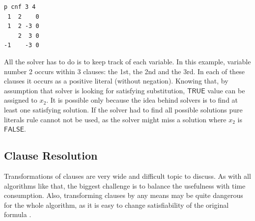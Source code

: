 \documentclass[12pt,english,pdflatex]{aghdpl}
\begin{document}
\begin{lstlisting}
p cnf 3 4
 1  2    0
 1  2 -3 0
    2  3 0
-1    -3 0
\end{lstlisting}

All the solver has to do is to keep track of each variable. In this
example, variable number 2 occurs within 3 clauses: the 1st, the 2nd and the 3rd.
In each of these clauses it occurs as a positive literal (without negation).
Knowing that, by assumption that solver is looking for satisfying
substitution, $\mathsf{TRUE}$ value can be assigned to $x_2$. It is possible
only because the idea behind solvers is to find at least one satisfying
solution. If the solver had to find all possible solutions pure literals rule
cannot not be used, as the solver might miss a solution where $x_2$
is $\mathsf{FALSE}$.

\subsection{Clause Resolution}
\label{subsec:Clause-evaluation}

Transformations of clauses are very wide and difficult topic to discuss.
As with all
algorithms like that, the biggest challenge is to balance the usefulness
with time consumption. Also, transforming clauses by any means may be quite
dangerous for the whole algorithm, as it is easy to change satisfiability
of the original formula \cite{Biere:2009}.
\end{document}
